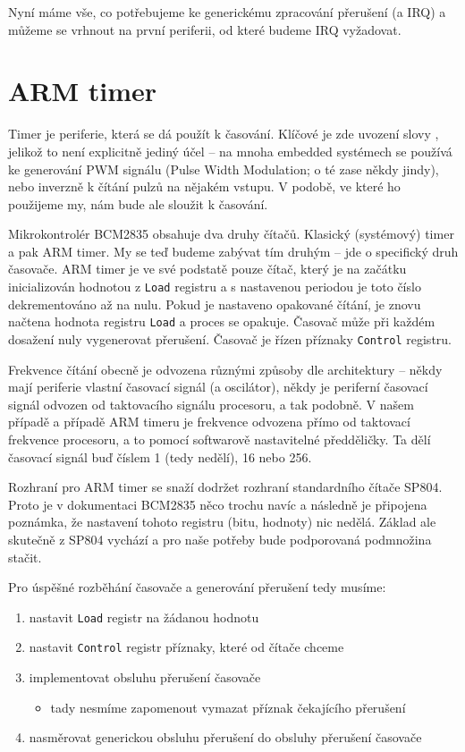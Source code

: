 \documentclass{article}
\begin{document}
Nyní máme vše, co potřebujeme ke generickému zpracování přerušení (a IRQ) a můžeme se vrhnout na první periferii, od které budeme IRQ vyžadovat.

\section{ARM timer}

Timer je periferie, která se dá použít k časování. Klíčové je zde uvození slovy , jelikož to není explicitně jediný účel -- na mnoha embedded systémech se používá ke generování PWM signálu (Pulse Width Modulation; o té zase někdy jindy), nebo inverzně k čítání pulzů na nějakém vstupu. V podobě, ve které ho použijeme my, nám bude ale sloužit k časování.

Mikrokontrolér BCM2835 obsahuje dva druhy čítačů. Klasický (systémový) timer a pak ARM timer. My se teď budeme zabývat tím druhým -- jde o specifický druh časovače. ARM timer je ve své podstatě pouze čítač, který je na začátku inicializován hodnotou z \texttt{Load} registru a s nastavenou periodou je toto číslo dekrementováno až na nulu. Pokud je nastaveno opakované čítání, je znovu načtena hodnota registru \texttt{Load} a proces se opakuje. Časovač může při každém dosažení nuly vygenerovat přerušení. Časovač je řízen příznaky \texttt{Control} registru.

Frekvence čítání obecně je odvozena různými způsoby dle architektury -- někdy mají periferie vlastní časovací signál (a oscilátor), někdy je periferní časovací signál odvozen od taktovacího signálu procesoru, a tak podobně. V našem případě a případě ARM timeru je frekvence odvozena přímo od taktovací frekvence procesoru, a to pomocí softwarově nastavitelné předděličky. Ta dělí časovací signál buď číslem 1 (tedy nedělí), 16 nebo 256.

Rozhraní pro ARM timer se snaží dodržet rozhraní standardního čítače SP804. Proto je v dokumentaci BCM2835 něco trochu navíc a následně je připojena poznámka, že nastavení tohoto registru (bitu, hodnoty) nic nedělá. Základ ale skutečně z SP804 vychází a pro naše potřeby bude podporovaná podmnožina stačit.

Pro úspěšné rozběhání časovače a generování přerušení tedy musíme:
\begin{enumerate}
	\item nastavit \texttt{Load} registr na žádanou hodnotu
	\item nastavit \texttt{Control} registr příznaky, které od čítače chceme
	\item implementovat obsluhu přerušení časovače
		\begin{itemize}
			\item tady nesmíme zapomenout vymazat příznak čekajícího přerušení
		\end{itemize}
	\item nasměrovat generickou obsluhu přerušení do obsluhy přerušení časovače
\end{enumerate}
\end{document}
